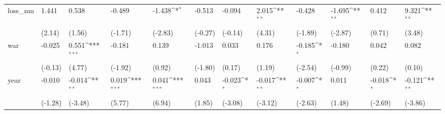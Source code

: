 \def\sym#1{\ifmmode^{#1}\else\(^{#1}\)\fi}
\begin{tabular}{p{1.5cm} p{2cm} p{1.7cm} p{1.7cm} p{1.7cm} p{1.7cm} p{1.7cm} p{1.7cm} p{1.7cm} p{1.7cm} p{1.7cm} p{1.7cm}}
\hline
loss\_nm         &    1.441         &    0.538         &   -0.489         &   -1.438\sym{*}  &   -0.513         &   -0.094         &    2.015\sym{**} &   -0.428         &   -1.695\sym{**} &    0.412         &    9.321\sym{**} \\
                &   (2.14)         &   (1.56)         &  (-1.71)         &  (-2.83)         &  (-0.27)         &  (-0.14)         &   (4.31)         &  (-1.89)         &  (-2.87)         &   (0.71)         &   (3.48)         \\
war             &   -0.025         &    0.551\sym{***}&   -0.181         &    0.139         &   -1.013         &    0.033         &    0.176         &   -0.185\sym{*}  &   -0.180         &    0.042         &    0.082         \\
                &  (-0.13)         &   (4.77)         &  (-1.92)         &   (0.92)         &  (-1.80)         &   (0.17)         &   (1.19)         &  (-2.54)         &  (-0.99)         &   (0.22)         &   (0.10)         \\
year            &   -0.010         &   -0.014\sym{**} &    0.019\sym{***}&    0.041\sym{***}&    0.043         &   -0.023\sym{*}  &   -0.017\sym{**} &   -0.007\sym{*}  &    0.011         &   -0.018\sym{*}  &   -0.121\sym{**} \\
                &  (-1.28)         &  (-3.48)         &   (5.77)         &   (6.94)         &   (1.85)         &  (-3.08)         &  (-3.12)         &  (-2.63)         &   (1.48)         &  (-2.69)         &  (-3.86)         \\
\end{tabular}
\def\sym#1{\ifmmode^{#1}\else\(^{#1}\)\fi}
